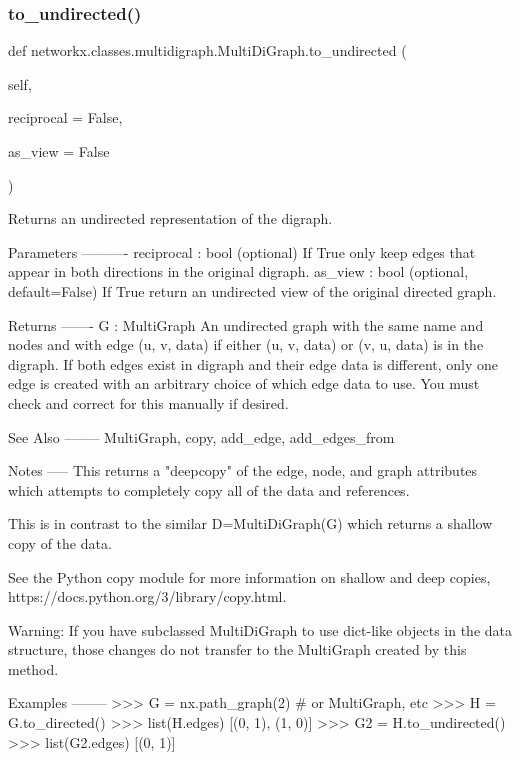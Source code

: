 \subsubsection{\texorpdfstring{to\+\_\+undirected()}{to\_undirected()}}
{\footnotesize\ttfamily def networkx.\+classes.\+multidigraph.\+Multi\+Di\+Graph.\+to\+\_\+undirected (\begin{DoxyParamCaption}\item[{}]{self,  }\item[{}]{reciprocal = {\ttfamily False},  }\item[{}]{as\+\_\+view = {\ttfamily False} }\end{DoxyParamCaption})}

\begin{DoxyVerb}Returns an undirected representation of the digraph.

Parameters
----------
reciprocal : bool (optional)
  If True only keep edges that appear in both directions
  in the original digraph.
as_view : bool (optional, default=False)
  If True return an undirected view of the original directed graph.

Returns
-------
G : MultiGraph
    An undirected graph with the same name and nodes and
    with edge (u, v, data) if either (u, v, data) or (v, u, data)
    is in the digraph.  If both edges exist in digraph and
    their edge data is different, only one edge is created
    with an arbitrary choice of which edge data to use.
    You must check and correct for this manually if desired.

See Also
--------
MultiGraph, copy, add_edge, add_edges_from

Notes
-----
This returns a "deepcopy" of the edge, node, and
graph attributes which attempts to completely copy
all of the data and references.

This is in contrast to the similar D=MultiDiGraph(G) which
returns a shallow copy of the data.

See the Python copy module for more information on shallow
and deep copies, https://docs.python.org/3/library/copy.html.

Warning: If you have subclassed MultiDiGraph to use dict-like
objects in the data structure, those changes do not transfer
to the MultiGraph created by this method.

Examples
--------
>>> G = nx.path_graph(2)  # or MultiGraph, etc
>>> H = G.to_directed()
>>> list(H.edges)
[(0, 1), (1, 0)]
>>> G2 = H.to_undirected()
>>> list(G2.edges)
[(0, 1)]
\end{DoxyVerb}
 

